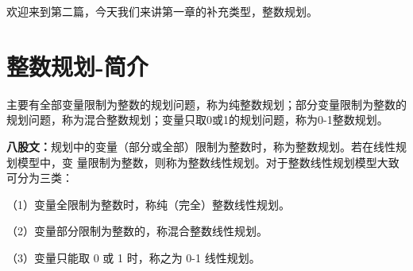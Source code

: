 \documentclass[a4paper,20pt]{article}
\title{}
\author{}
\date{}
\begin{document}
\renewcommand{\lstlistlistingname}{代码汇总}
\renewcommand{\lstlistingname}{代码}
\renewcommand\tablename{表}
欢迎来到第二篇，今天我们来讲第一章的补充类型，整数规划。
\section{整数规划-简介}
\par 主要有全部变量限制为整数的规划问题，称为纯整数规划；部分变量限制为整数的规划问题，称为混合整数规划；变量只取0或1的规划问题，称为0-1整数规划。
\par \textbf{八股文：}规划中的变量（部分或全部）限制为整数时，称为整数规划。若在线性规划模型中，变
量限制为整数，则称为整数线性规划。对于整数线性规划模型大致可分为三类：
\par （1）变量全限制为整数时，称纯（完全）整数线性规划。
\par （2）变量部分限制为整数的，称混合整数线性规划。
\par （3）变量只能取 0 或 1 时，称之为 0-1 线性规划。
\end{document}
